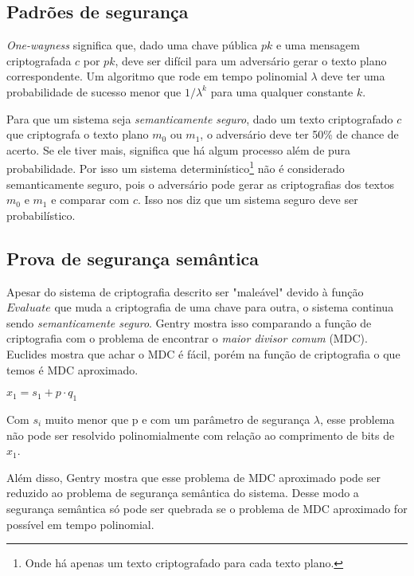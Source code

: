 \subsection{Padrões de segurança}
\textit{One-wayness} significa que, dado uma chave pública $pk$ e uma mensagem criptografada $c$ por $pk$, deve ser difícil para um adversário gerar o texto plano correspondente. Um algoritmo que rode em tempo polinomial $\lambda$ deve ter uma probabilidade de sucesso menor que $1/\lambda^k$ para uma qualquer constante $k$.

Para que um sistema seja \textit{semanticamente seguro}, dado um texto criptografado $c$ que criptografa o texto plano $m_0$ ou $m_1$, o adversário deve ter 50\% de chance de acerto. Se ele tiver mais, significa que há algum processo além de pura probabilidade. Por isso um sistema determinístico\footnote{Onde há apenas um texto criptografado para cada texto plano.} não é considerado semanticamente seguro, pois o adversário pode gerar as criptografias dos textos $m_0$ e $m_1$ e comparar com $c$. Isso nos diz que um sistema seguro deve ser probabilístico.

\subsection{Prova de segurança semântica}
Apesar do sistema de criptografia descrito ser "maleável" devido à função $Evaluate$ que muda a criptografia de uma chave para outra, o sistema continua sendo \textit{semanticamente seguro}. Gentry mostra isso comparando a função de criptografia com o problema de encontrar o \textit{maior divisor comum} (MDC). Euclides mostra que achar o MDC é fácil, porém na função de criptografia o que temos é MDC aproximado.
\begin{center}
	$x_1 = s_1 + p \cdot q_1$
\end{center}
Com $s_i$ muito menor que p e com um parâmetro de segurança $\lambda$, esse problema não pode ser resolvido polinomialmente com relação ao comprimento de bits de $x_1$.

Além disso, Gentry mostra que esse problema de MDC aproximado pode ser reduzido ao problema de segurança semântica do sistema. Desse modo a segurança semântica só pode ser quebrada se o problema de MDC aproximado for possível em tempo polinomial.

